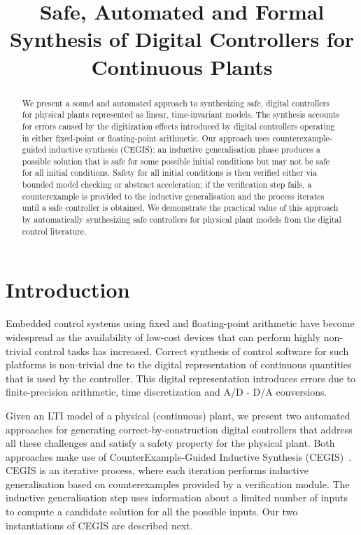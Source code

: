 \documentclass[submission]{eptcs}
\title{Safe, Automated and Formal Synthesis of Digital Controllers 
for Continuous Plants}
\begin{document}
\maketitle

\begin{abstract}
We present a sound and automated approach to synthesizing safe,
digital controllers for physical plants represented as linear,
time-invariant models. The synthesis
accounts for errors caused by the digitization effects introduced by
digital controllers operating in either fixed-point or floating-point arithmetic. 
Our approach uses counterexample-guided inductive
synthesis (CEGIS): an inductive generalisation phase produces a
possible solution that is safe for some possible initial conditions but may
not be safe for all initial conditions. Safety for all initial conditions
is then verified either
via bounded model checking or abstract acceleration; if the verification step fails, a
counterexample is provided to the inductive generalisation and the
process iterates until a safe controller is obtained.  We demonstrate
the practical value of this approach by automatically synthesizing
safe controllers for physical plant models from the digital control
literature.
\end{abstract}

\section{Introduction}

Embedded control systems using fixed and floating-point arithmetic 
have become widespread
as the availability of low-cost devices that can perform highly
non-trivial control tasks has increased. Correct synthesis of
control software for such platforms is non-trivial due to the digital representation of continuous quantities 
that is used by the controller. This digital representation introduces 
errors due to finite-precision arithmetic, time discretization and 
A/D - D/A conversions.


%
Given an LTI model of a physical (continuous) plant, we present two automated approaches for generating
correct-by-construction digital controllers that address all these
challenges and satisfy a safety property for the physical plant. 
Both approaches make use of CounterExample-Guided
Inductive Synthesis (CEGIS)~\cite{jha-icse10,
  DBLP:conf/asplos/Solar-LezamaTBSS06}.  CEGIS is an
iterative process, where each iteration performs inductive
generalisation based on counterexamples provided by a verification module. 
The inductive generalisation step uses information 
about a limited number of inputs to compute a candidate solution
for all the possible inputs. Our two instantiations of CEGIS are
described next.
\end{document}
